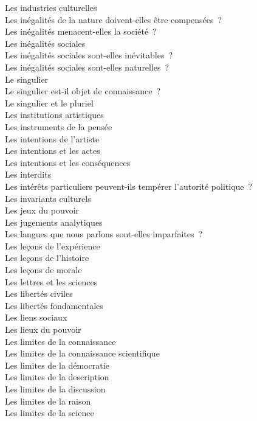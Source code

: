 \documentclass[a4paper,12pt]{article}
\begin{document}
Les industries culturelles \\
Les inégalités de la nature doivent-elles être compensées ? \\
Les inégalités menacent-elles la société ? \\
Les inégalités sociales \\
Les inégalités sociales sont-elles inévitables ? \\
Les inégalités sociales sont-elles naturelles ? \\
Le singulier \\
Le singulier est-il objet de connaissance ? \\
Le singulier et le pluriel \\
Les institutions artistiques \\
Les instruments de la pensée \\
Les intentions de l'artiste \\
Les intentions et les actes \\
Les intentions et les conséquences \\
Les interdits \\
Les intérêts particuliers peuvent-ils tempérer l'autorité politique ? \\
Les invariants culturels \\
Les jeux du pouvoir \\
Les jugements analytiques \\
Les langues que nous parlons sont-elles imparfaites ? \\
Les leçons de l'expérience \\
Les leçons de l'histoire \\
Les leçons de morale \\
Les lettres et les sciences \\
Les libertés civiles \\
Les libertés fondamentales \\
Les liens sociaux \\
Les lieux du pouvoir \\
Les limites de la connaissance \\
Les limites de la connaissance scientifique \\
Les limites de la démocratie \\
Les limites de la description \\
Les limites de la discussion \\
Les limites de la raison \\
Les limites de la science \\
\end{document}
